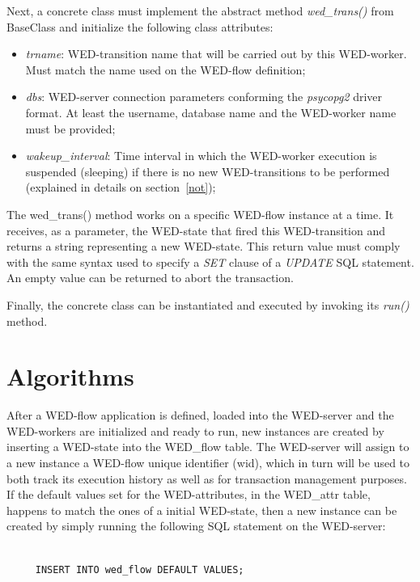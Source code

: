 \documentclass[conference]{IEEEtran}
\begin{document}
\par  Next, a concrete class must implement the abstract method \emph{wed\_trans()} from BaseClass and initialize the following
class attributes: 
\begin{itemize}
\item \emph{trname}: WED-transition name that will be carried out by this WED-worker. Must match the name used on the WED-flow definition;
\item \emph{dbs}: WED-server connection parameters conforming the \emph{psycopg2} driver format. At least the username, database name and
                 the WED-worker name must be provided;
\item \emph{wakeup\_interval}: Time interval in which the WED-worker execution is suspended (sleeping) if there is no new WED-transitions
                              to be performed (explained in details on section~\ref{not}); 
\end{itemize}

The wed\_trans() method works on a specific WED-flow instance at a time. It receives, as a parameter, the WED-state that 
fired this WED-transition and returns a string representing a new WED-state. This return value must comply with the same
syntax used to specify a \emph{SET} clause of a \emph{UPDATE} SQL statement. An empty value can be returned to abort the
transaction.

\par Finally, the concrete class can be instantiated and executed by invoking its \emph{run()} method.

\section{Algorithms}

After a WED-flow application is defined, loaded into the WED-server and the WED-workers are initialized and ready to run,
new instances are created by inserting a WED-state into the WED\_flow table. The WED-server will assign to a new instance 
a WED-flow unique identifier (wid), which in turn will be used to both track its execution history as well as for transaction
management purposes. If the default values set for the WED-attributes, in the WED\_attr table, happens to match the ones
of a initial WED-state, then a new instance can be created by simply running the following SQL statement on the WED-server:

\begin{Verbatim}[fontsize=\small]

     INSERT INTO wed_flow DEFAULT VALUES;
\end{Verbatim}
\end{document}
